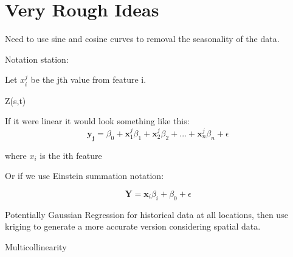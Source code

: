 
\section{Very Rough Ideas}



Need to use sine and cosine curves to removal the seasonality of the data.


Notation station:

Let $x_i^j$ be the jth value from feature i.


Z(s,t) 
    
If it were linear it would look something like this:  
$$\mathbf{y_j} = \beta_0 + \mathbf{x}_1^j\beta_1 + \mathbf{x}_2^j\beta_2+ ... + \mathbf{x}_n^j\beta_n + \epsilon $$

where $x_i$ is the ith feature

Or if we use Einstein summation notation:

$$\mathbf{Y} = \mathbf{x}_i\beta_i + \beta_0 + \epsilon $$

Potentially Gaussian Regression for historical data at all locations, then use kriging to generate a more accurate version considering spatial data.


Multicollinearity